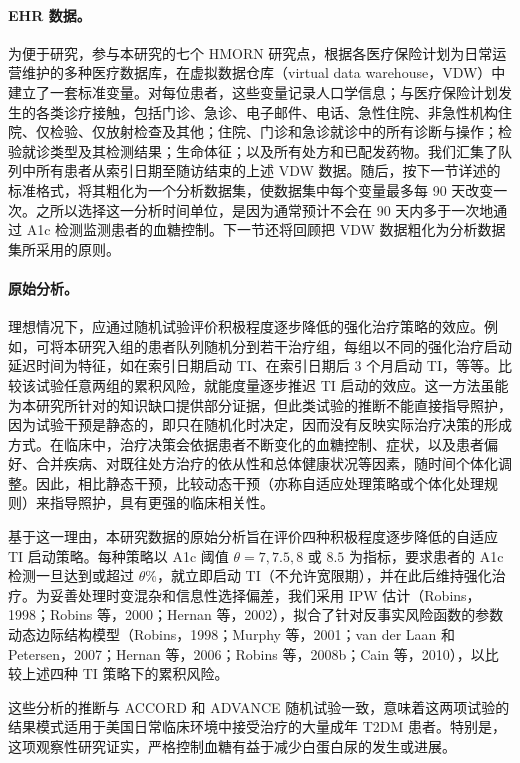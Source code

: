 \paragraph{EHR 数据。}
为便于研究，参与本研究的七个 HMORN 研究点，根据各医疗保险计划为日常运营维护的多种医疗数据库，在虚拟数据仓库（virtual data warehouse，VDW）中建立了一套标准变量。对每位患者，这些变量记录人口学信息；与医疗保险计划发生的各类诊疗接触，包括门诊、急诊、电子邮件、电话、急性住院、非急性机构住院、仅检验、仅放射检查及其他；住院、门诊和急诊就诊中的所有诊断与操作；检验就诊类型及其检测结果；生命体征；以及所有处方和已配发药物。我们汇集了队列中所有患者从索引日期至随访结束的上述 VDW 数据。随后，按下一节详述的标准格式，将其粗化为一个分析数据集，使数据集中每个变量最多每 90 天改变一次。之所以选择这一分析时间单位，是因为通常预计不会在 90 天内多于一次地通过 A1c 检测监测患者的血糖控制。下一节还将回顾把 VDW 数据粗化为分析数据集所采用的原则。

\paragraph{原始分析。}
理想情况下，应通过随机试验评价积极程度逐步降低的强化治疗策略的效应。例如，可将本研究入组的患者队列随机分到若干治疗组，每组以不同的强化治疗启动延迟时间为特征，如在索引日期启动 TI、在索引日期后 3 个月启动 TI，等等。比较该试验任意两组的累积风险，就能度量逐步推迟 TI 启动的效应。这一方法虽能为本研究所针对的知识缺口提供部分证据，但此类试验的推断不能直接指导照护，因为试验干预是静态的，即只在随机化时决定，因而没有反映实际治疗决策的形成方式。在临床中，治疗决策会依据患者不断变化的血糖控制、症状，以及患者偏好、合并疾病、对既往处方治疗的依从性和总体健康状况等因素，随时间个体化调整。因此，相比静态干预，比较动态干预（亦称自适应处理策略或个体化处理规则）来指导照护，具有更强的临床相关性。

基于这一理由，本研究数据的原始分析旨在评价四种积极程度逐步降低的自适应 TI 启动策略。每种策略以 A1c 阈值 $\theta=7,7.5,8$ 或 $8.5$ 为指标，要求患者的 A1c 检测一旦达到或超过 $\theta\%$，就立即启动 TI（不允许宽限期），并在此后维持强化治疗。为妥善处理时变混杂和信息性选择偏差，我们采用 IPW 估计（Robins，1998；Robins 等，2000；Hernan 等，2002），拟合了针对反事实风险函数的参数动态边际结构模型（Robins，1998；Murphy 等，2001；van der Laan 和 Petersen，2007；Hernan 等，2006；Robins 等，2008b；Cain 等，2010），以比较上述四种 TI 策略下的累积风险。

这些分析的推断与 ACCORD 和 ADVANCE 随机试验一致，意味着这两项试验的结果模式适用于美国日常临床环境中接受治疗的大量成年 T2DM 患者。特别是，这项观察性研究证实，严格控制血糖有益于减少白蛋白尿的发生或进展。

